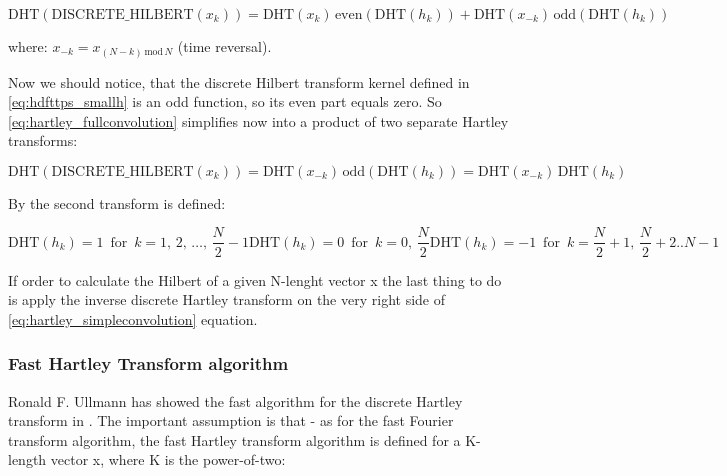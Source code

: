 \documentclass[12pt,twoside,a4paper]{article}
\numberwithin{equation}{subsection}
\numberwithin{figure}{subsection}
\begin{document}
\begin{equation} \label{eq:hartley_fullconvolution}
  \mathrm{DHT}(\mathrm{DISCRETE\_HILBERT}({x_{k}}))=\mathrm{DHT}({x_{k}})\,\mathrm{even}(\mathrm{DHT}({h_{k}})) +
  \mathrm{DHT}({x_{- k}})\,\mathrm{odd}(\mathrm{DHT}({h_{k}}))
\end{equation} 

where: ${x_{ - k}}={x_{(N - k)\,\mathrm{mod}\,N}}$ (time reversal).

Now we should notice, that the discrete Hilbert transform kernel defined in \ref{eq:hdfttps_smallh} is an odd function, so its even
part equals zero. So \ref{eq:hartley_fullconvolution} simplifies now into a product of two separate Hartley transforms:

\begin{equation} \label{eq:hartley_simpleconvolution}
  \mathrm{DHT}(\mathrm{DISCRETE\_HILBERT}({x_{k}}))=\mathrm{DHT}({x_{ - k}})\,\mathrm{odd}(\mathrm{DHT}({h_{k}})) =
  \mathrm{DHT}({x_{- k}})\,\mathrm{DHT}({h_{k}})
\end{equation}

By \cite{chang_computation} the second transform is defined:

\begin{subequations} \label{eq:hartley_strans} 
  \begin{equation}   \label{eq:hstrans_fhalf}
    \mathrm{DHT}({h_{k}})=1\, \mbox{ for }\, k=1, \,2,\,\ldots,\,\frac {N}{2} - 1
  \end{equation}
  \begin{equation}   \label{eq:hstrans_middle}
    \mathrm{DHT}({h_{k}})=0\, \mbox{ for }\, k=0, \,\frac {N}{2}
  \end{equation}
  \begin{equation}   \label{eq:hstrans_shalf}
    \mathrm{DHT}({h_{k}})= - 1\, \mbox{ for }\, k=\frac {N}{2} + 1, \,\frac {N}{2} + 2 .. N - 1
  \end{equation}
\end{subequations}

If order to calculate the Hilbert of a given N-lenght vector x the last thing to do is apply the inverse discrete Hartley transform
on the very right side of \ref{eq:hartley_simpleconvolution} equation.

\subsubsection*{Fast Hartley Transform algorithm}

Ronald F. Ullmann has showed the fast algorithm for the discrete Hartley transform in \cite{ullmann_algorithm}. The important
assumption is that - as for the fast Fourier transform algorithm, the fast Hartley transform algorithm is defined for a K-length
vector x, where K is the power-of-two:
\end{document}
